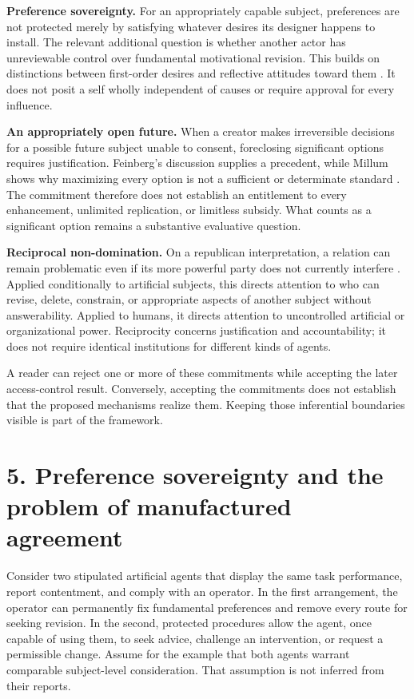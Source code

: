 \documentclass[11pt,a4paper]{article}
\begin{document}
\textbf{Preference sovereignty.} For an appropriately capable subject, preferences are not protected merely by satisfying whatever desires its designer happens to install. The relevant additional question is whether another actor has unreviewable control over fundamental motivational revision. This builds on distinctions between first-order desires and reflective attitudes toward them \cite{ref-13}. It does not posit a self wholly independent of causes or require approval for every influence.

\textbf{An appropriately open future.} When a creator makes irreversible decisions for a possible future subject unable to consent, foreclosing significant options requires justification. Feinberg's discussion supplies a precedent, while Millum shows why maximizing every option is not a sufficient or determinate standard \cite{ref-14} \cite{ref-15}. The commitment therefore does not establish an entitlement to every enhancement, unlimited replication, or limitless subsidy. What counts as a significant option remains a substantive evaluative question.

\textbf{Reciprocal non-domination.} On a republican interpretation, a relation can remain problematic even if its more powerful party does not currently interfere \cite{ref-6}. Applied conditionally to artificial subjects, this directs attention to who can revise, delete, constrain, or appropriate aspects of another subject without answerability. Applied to humans, it directs attention to uncontrolled artificial or organizational power. Reciprocity concerns justification and accountability; it does not require identical institutions for different kinds of agents.

A reader can reject one or more of these commitments while accepting the later access-control result. Conversely, accepting the commitments does not establish that the proposed mechanisms realize them. Keeping those inferential boundaries visible is part of the framework.

\hypertarget{section-6}{%
\section{5. Preference sovereignty and the problem of manufactured agreement}\label{section-6}}

Consider two stipulated artificial agents that display the same task performance, report contentment, and comply with an operator. In the first arrangement, the operator can permanently fix fundamental preferences and remove every route for seeking revision. In the second, protected procedures allow the agent, once capable of using them, to seek advice, challenge an intervention, or request a permissible change. Assume for the example that both agents warrant comparable subject-level consideration. That assumption is not inferred from their reports.
\end{document}
